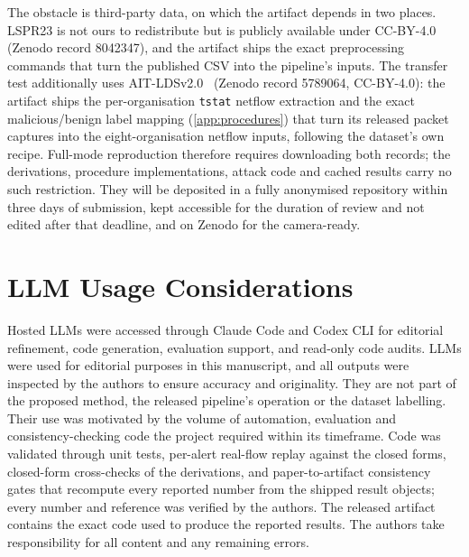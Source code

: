 \documentclass[conference]{IEEEtran}
\begin{document}
The obstacle is third-party data, on which the artifact depends in two places. LSPR23 is not ours to
redistribute but is publicly available under CC-BY-4.0 (Zenodo record 8042347), and the artifact ships the
exact preprocessing commands that turn the published CSV into the pipeline's inputs. The transfer test
additionally uses AIT-LDSv2.0~\cite{aitlds} (Zenodo record 5789064, CC-BY-4.0): the artifact ships the
per-organisation \texttt{tstat} netflow extraction and the exact malicious/benign label mapping
(\cref{app:procedures}) that turn its released packet captures into the eight-organisation netflow inputs,
following the dataset's own recipe. Full-mode reproduction therefore requires downloading both records;
the derivations, procedure implementations, attack code and cached results carry no such restriction.
They will be deposited in a fully anonymised repository within three days of submission, kept accessible
for the duration of review and not edited after that deadline, and on Zenodo for the camera-ready.

\section*{LLM Usage Considerations}

Hosted LLMs were accessed through Claude Code and Codex CLI for editorial refinement, code generation,
evaluation support, and read-only code audits. LLMs were used for editorial purposes in this manuscript,
and all outputs were inspected by the authors to ensure accuracy and originality. They are not part of
the proposed method, the released pipeline's operation or the dataset labelling. Their use was motivated
by the volume of automation, evaluation and consistency-checking code the project required within its
timeframe. Code was validated
through unit tests, per-alert real-flow replay against the closed forms, closed-form cross-checks of the
derivations, and paper-to-artifact consistency gates that recompute every reported number from the
shipped result objects; every number and reference was verified by the authors. The released artifact
contains the exact code used to produce the reported results. The authors take responsibility for all
content and any remaining errors.
\end{document}
